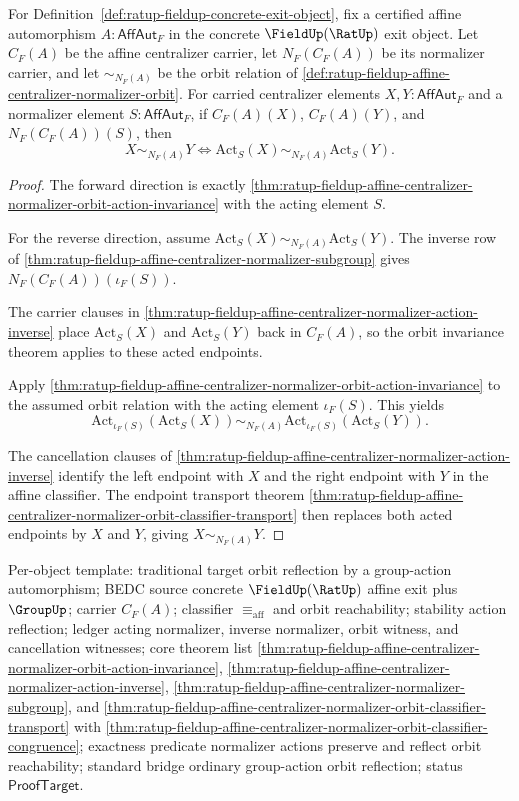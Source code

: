 \begin{theorem}
\label{thm:ratup-fieldup-affine-centralizer-normalizer-orbit-action-iff}
For Definition~\ref{def:ratup-fieldup-concrete-exit-object}, fix a certified
affine automorphism $A:\mathsf{AffAut}_F$ in the concrete $\FieldUp(\RatUp)$
exit object. Let $C_F(A)$ be the affine centralizer carrier, let
$N_F(C_F(A))$ be its normalizer carrier, and let $\sim_{N_F(A)}$ be the orbit
relation of
\autoref{def:ratup-fieldup-affine-centralizer-normalizer-orbit}. For carried
centralizer elements $X,Y:\mathsf{AffAut}_F$ and a normalizer element
$S:\mathsf{AffAut}_F$, if $C_F(A)(X)$, $C_F(A)(Y)$, and $N_F(C_F(A))(S)$,
then
$$
X\sim_{N_F(A)}Y
\Longleftrightarrow
\mathrm{Act}_S(X)\sim_{N_F(A)}\mathrm{Act}_S(Y).
$$
\end{theorem}
\begin{proof}
The forward direction is exactly
\autoref{thm:ratup-fieldup-affine-centralizer-normalizer-orbit-action-invariance}
with the acting element $S$.

For the reverse direction, assume
$\mathrm{Act}_S(X)\sim_{N_F(A)}\mathrm{Act}_S(Y)$. The inverse row of
\autoref{thm:ratup-fieldup-affine-centralizer-normalizer-subgroup} gives
$N_F(C_F(A))(\iota_F(S))$.

The carrier clauses in
\autoref{thm:ratup-fieldup-affine-centralizer-normalizer-action-inverse} place
$\mathrm{Act}_S(X)$ and $\mathrm{Act}_S(Y)$ back in $C_F(A)$, so the orbit
invariance theorem applies to these acted endpoints.

Apply
\autoref{thm:ratup-fieldup-affine-centralizer-normalizer-orbit-action-invariance}
to the assumed orbit relation with the acting element $\iota_F(S)$. This yields
$$
\mathrm{Act}_{\iota_F(S)}(\mathrm{Act}_S(X))
\sim_{N_F(A)}
\mathrm{Act}_{\iota_F(S)}(\mathrm{Act}_S(Y)).
$$

The cancellation clauses of
\autoref{thm:ratup-fieldup-affine-centralizer-normalizer-action-inverse}
identify the left endpoint with $X$ and the right endpoint with $Y$ in the
affine classifier. The endpoint transport theorem
\autoref{thm:ratup-fieldup-affine-centralizer-normalizer-orbit-classifier-transport}
then replaces both acted endpoints by $X$ and $Y$, giving
$X\sim_{N_F(A)}Y$.
\end{proof}

Per-object template: traditional target orbit reflection by a group-action
automorphism; BEDC source concrete $\FieldUp(\RatUp)$ affine exit plus
$\GroupUp$; carrier $C_F(A)$; classifier $\equiv_{\mathrm{aff}}$ and orbit
reachability; stability action reflection; ledger acting normalizer, inverse
normalizer, orbit witness, and cancellation witnesses; core theorem list
\autoref{thm:ratup-fieldup-affine-centralizer-normalizer-orbit-action-invariance},
\autoref{thm:ratup-fieldup-affine-centralizer-normalizer-action-inverse},
\autoref{thm:ratup-fieldup-affine-centralizer-normalizer-subgroup}, and
\autoref{thm:ratup-fieldup-affine-centralizer-normalizer-orbit-classifier-transport}
with
\autoref{thm:ratup-fieldup-affine-centralizer-normalizer-orbit-classifier-congruence};
exactness predicate normalizer actions preserve and reflect orbit reachability;
standard bridge ordinary group-action orbit reflection; status
$\mathsf{ProofTarget}$.
